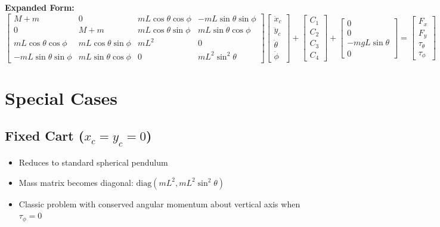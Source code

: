 \documentclass[12pt]{article}
\begin{document}
\textbf{Expanded Form:}
\begin{equation}
    \begin{bmatrix}
        M+m & 0 & mL\cos\theta\cos\phi & -mL\sin\theta\sin\phi \\
        0 & M+m & mL\cos\theta\sin\phi & mL\sin\theta\cos\phi \\
        mL\cos\theta\cos\phi & mL\cos\theta\sin\phi & mL^2 & 0 \\
        -mL\sin\theta\sin\phi & mL\sin\theta\cos\phi & 0 & mL^2\sin^2\theta
    \end{bmatrix}
    \begin{bmatrix}
        \ddot{x}_c \\ \ddot{y}_c \\ \ddot{\theta} \\ \ddot{\phi}
    \end{bmatrix}
    +
    \begin{bmatrix}
        C_1 \\ C_2 \\ C_3 \\ C_4
    \end{bmatrix}
    +
    \begin{bmatrix}
        0 \\ 0 \\ -mgL\sin\theta \\ 0
    \end{bmatrix}
    =
    \begin{bmatrix}
        F_x \\ F_y \\ \tau_\theta \\ \tau_\phi
    \end{bmatrix}
\end{equation}

\section{Special Cases}

\subsection{Fixed Cart ($x_c = y_c = 0$)}
\begin{itemize}
    \item Reduces to standard spherical pendulum
    \item Mass matrix becomes diagonal: $\text{diag}(mL^2, mL^2\sin^2\theta)$
    \item Classic problem with conserved angular momentum about vertical axis when $\tau_\phi = 0$
\end{itemize}
\end{document}
